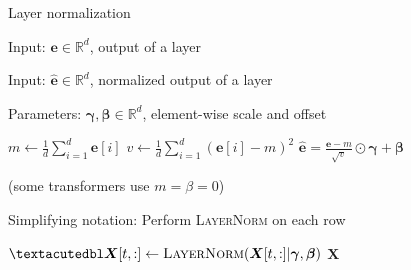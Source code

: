 \documentclass[12pt,aspectratio=169,handout]{beamer}
\begin{document}
\begin{frame}{Layer normalization}
	
Input: $\bm{e} \in \mathbb{R}^{d}$, output of a layer

Input: $\bm{\hat e} \in \mathbb{R}^{d}$, normalized output of a layer

Parameters: $\bm{\gamma}, \bm{\beta} \in \mathbb{R}^{d}$, element-wise scale and offset

\bigskip

\begin{algorithmic}[1]
	\State $m \gets \frac{1}{d} \sum_{i = 1}^{d} \bm{e}[i]$
	\State $v \gets \frac{1}{d} \sum_{i = 1}^{d} (\bm{e}[i] - m)^2$
	\State \Return $\bm{\hat e} = \frac{\bm{e} - m}{\sqrt{v}} \odot \bm{\gamma} + \bm{\beta}$
	\EndFunction
\end{algorithmic}	

\begin{small}
(some transformers use $m = \beta = 0$)
\end{small}
	
\end{frame}

\begin{frame}{Simplifying notation: Perform \textsc{LayerNorm} on each row}
	
	
\begin{algorithmic}[1]
	\State $˝\bm{X}[t,:] \gets \textsc{LayerNorm}(\bm{X}{[t,:]} | \bm{\gamma}, \bm{\beta})$
	\EndFor
	\State \Return $\bm{X}$
	\EndFunction
\end{algorithmic}
	
	
\end{frame}
\end{document}
